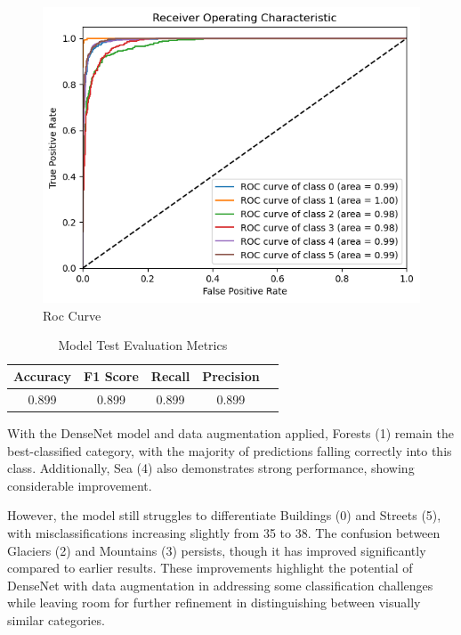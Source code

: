 \begin{figure}[H]
    \centering
    \includegraphics[width=1\linewidth]{images/densenet_roc_aug.png}
    \caption{Roc Curve}
    \label{fig:rocincial}
\end{figure}

\begin{table}[H]
    \centering
    \caption{Model Test Evaluation Metrics} 
    \begin{tabular}{||c|c|c|c|c||} 
        \hline
        Accuracy & F1 Score & Recall & Precision \\
        \hline\hline
        0.899 & 0.899 & 0.899 & 0.899 \\        
        \hline
    \end{tabular}
    \label{tab:tab_LogReg}
\end{table}



With the DenseNet model and data augmentation applied, Forests (1) remain the best-classified category, with the majority of predictions falling correctly into this class. Additionally, Sea (4) also demonstrates strong performance, showing considerable improvement.

However, the model still struggles to differentiate Buildings (0) and Streets (5), with misclassifications increasing slightly from 35 to 38. The confusion between Glaciers (2) and Mountains (3) persists, though it has improved significantly compared to earlier results. These improvements highlight the potential of DenseNet with data augmentation in addressing some classification challenges while leaving room for further refinement in distinguishing between visually similar categories.

